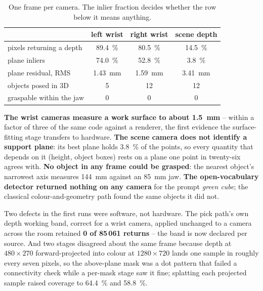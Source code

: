 \begin{table}[htbp]
  \centering
  \small
  \caption[Geometry recovered from each depth camera]{One frame per camera.
  The inlier fraction decides whether the row below it means anything.}
  \label{tab:vision-geometry}
  \begin{tabular}{@{}lccc@{}}
    \toprule
    & left wrist & right wrist & scene depth \\
    \midrule
    pixels returning a depth & \SI{89.4}{\percent} & \SI{80.5}{\percent} & \SI{14.5}{\percent} \\
    plane inliers & \SI{74.0}{\percent} & \SI{52.8}{\percent} & \SI{3.8}{\percent} \\
    plane residual, RMS & \SI{1.43}{\milli\metre} & \SI{1.59}{\milli\metre} & \SI{3.41}{\milli\metre} \\
    objects posed in 3D & 5 & 12 & 12 \\
    graspable within the jaw & 0 & 0 & 0 \\
    \bottomrule
  \end{tabular}
\end{table}

\textbf{The wrist cameras measure a work surface to about
\SI{1.5}{\milli\metre}} -- within a factor of three of the same code against
a renderer, the first evidence the surface-fitting stage transfers to
hardware. \textbf{The scene camera does not identify a support plane}: its
best plane holds \SI{3.8}{\percent} of the points, so every quantity that
depends on it (height, object boxes) rests on a plane one point in
twenty-six agrees with. \textbf{No object in any frame could be grasped}:
the nearest object's narrowest axis measures \SI{144}{\milli\metre} against
an \SI{85}{\milli\metre} jaw. \textbf{The open-vocabulary detector returned
nothing on any camera} for the prompt \emph{green cube}; the classical
colour-and-geometry path found the same objects it did not.

Two defects in the first runs were software, not hardware. The pick path's
own depth working band, correct for a wrist camera, applied unchanged to a
camera across the room retained \textbf{0 of 85\,061 returns} -- the band is
now declared per source. And two stages disagreed about the same frame
because depth at $480\times270$ forward-projected into colour at
$1280\times720$ lands one sample in roughly every seven pixels, so the
above-plane mask was a dot pattern that failed a connectivity check while a
per-mask stage saw it fine; splatting each projected sample raised coverage
to \SI{64.4}{\percent} and \SI{58.8}{\percent}.

